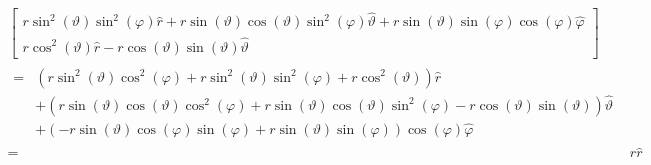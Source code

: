\documentclass[11pt,a4paper]{article}
\begin{document}
\begin{enumerate}
\begin{align*}
\begin{bmatrix}
r\sin^2(\vartheta)\sin^2(\varphi)\hat{r}+r\sin(\vartheta)\cos(\vartheta)\sin^2(\varphi)\hat{\vartheta}+r\sin(\vartheta)\sin(\varphi)\cos(\varphi)\hat{\varphi} \\
r\cos^2(\vartheta)\hat{r}-r\cos(\vartheta)\sin(\vartheta)\hat{\vartheta}
\end{bmatrix}\\
\begin{split}
=&
(r\sin^2(\vartheta)\cos^2(\varphi)+r\sin^2(\vartheta)\sin^2(\varphi)+r\cos^2(\vartheta))\hat{r}\\
&+(r\sin(\vartheta)\cos(\vartheta)\cos^2(\varphi)+r\sin(\vartheta)\cos(\vartheta)\sin^2(\varphi)-r\cos(\vartheta)\sin(\vartheta))\hat{\vartheta}\\
&+(-r\sin(\vartheta)\cos(\varphi)\sin(\varphi)+r\sin(\vartheta)\sin(\varphi))\cos(\varphi)\hat{\varphi}
\end{split}\\
=&
r\hat{r}
\end{align*}

\newpage


\end{enumerate}
\end{document}
